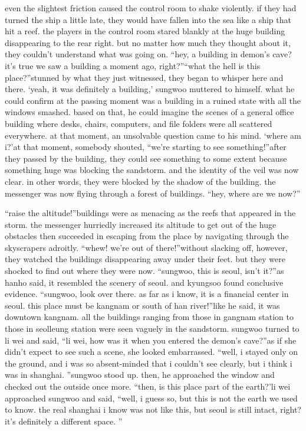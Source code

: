  even the slightest friction caused the control room to shake violently.
 if they had turned the ship a little late, they would have fallen into the sea like a ship that hit a reef.
the players in the control room stared blankly at the huge building disappearing to the rear right.
 but no matter how much they thought about it, they couldn’t understand what was going on.
“hey, a building in demon’s cave? it’s true we saw a building a moment ago, right?”“what the hell is this place?”stunned by what they just witnessed, they began to whisper here and there.
‘yeah, it was definitely a building,’ sungwoo muttered to himself.
what he could confirm at the passing moment was a building in a ruined state with all the windows smashed.
 based on that, he could imagine the scenes of a general office building where desks, chairs, computers, and file folders were all scattered everywhere.
at that moment, an unsolvable question came to his mind.
‘where am i?’at that moment, somebody shouted, “we’re starting to see something!”after they passed by the building, they could see something to some extent because something huge was blocking the sandstorm.
 and the identity of the veil was now clear.
 in other words, they were blocked by the shadow of the building.
the messenger was now flying through a forest of buildings.
“hey, where are we now?”

“raise the altitude!”buildings were as menacing as the reefs that appeared in the storm.
 the messenger hurriedly increased its altitude to get out of the huge obstacles then succeeded in escaping from the place by navigating through the skyscrapers adroitly.
“whew! we’re out of there!”without slacking off, however, they watched the buildings disappearing away under their feet.
but they were shocked to find out where they were now.
“sungwoo, this is seoul, isn’t it?”as hanho said, it resembled the scenery of seoul.
 and kyungsoo found conclusive evidence.
“sungwoo, look over there.
 as far as i know, it is a financial center in seoul.
 this place must be kangnam or south of han river!”like he said, it was downtown kangnam.
 all the buildings ranging from those in gangnam station to those in seolleung station were seen vaguely in the sandstorm.
sungwoo turned to li wei and said, “li wei, how was it when you entered the demon’s cave?”as if she didn’t expect to see such a scene, she looked embarrassed.
“well, i stayed only on the ground, and i was so absent-minded that i couldn’t see clearly, but i think i was in shanghai.
”sungwoo stood up.
 then, he approached the window and checked out the outside once more.
“then, is this place part of the earth?’li wei approached sungwoo and said, “well, i guess so, but this is not the earth we used to know.
 the real shanghai i know was not like this, but seoul is still intact, right? it’s definitely a different space.
”

 